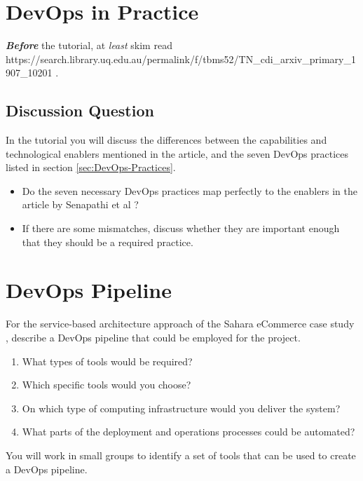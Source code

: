 \documentclass{csse4400}
\begin{document}


\section{DevOps in Practice}
\textbf{\textit{Before}} the tutorial, at \emph{least} skim read
{https://search.library.uq.edu.au/permalink/f/tbms52/TN_cdi_arxiv_primary_1907_10201}
\cite{SenapathiMali2018DCPa}.

\subsection{Discussion Question}
In the tutorial you will discuss the differences between the capabilities and technological enablers mentioned in the article,
and the seven DevOps practices listed in section \ref{sec:DevOps-Practices}.
\begin{itemize}
    \item Do the seven necessary DevOps practices map perfectly to the enablers in the article by Senapathi et al \cite{SenapathiMali2018DCPa}?
    \item If there are some mismatches, discuss whether they are important enough that they should be a required practice.
\end{itemize}


\section{DevOps Pipeline}
For the service-based architecture approach of the Sahara eCommerce case study \cite{service-based-slides},
describe a DevOps pipeline that could be employed for the project.
\begin{enumerate}
    \item What types of tools would be required?
    \item Which specific tools would you choose?
    \item On which type of computing infrastructure would you deliver the system?
    \item What parts of the deployment and operations processes could be automated?
\end{enumerate}

\noindent
You will work in small groups to identify a set of tools that can be used to create a DevOps pipeline.





\end{document}

